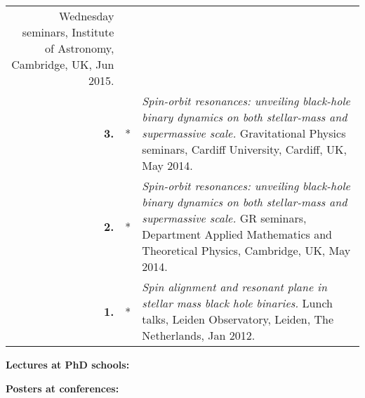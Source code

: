 {\begin{longtable}{rp{0.3cm}p{15.8cm}}
\newline{}
Wednesday seminars, Institute of Astronomy, Cambridge, UK, Jun 2015.
\vspace{0.05cm}\\
%
\textbf{3.} & * & \textit{Spin-orbit resonances: unveiling black-hole binary dynamics on both stellar-mass and supermassive scale.}
\newline{}
Gravitational Physics seminars, Cardiff University, Cardiff, UK, May 2014.
\vspace{0.05cm}\\
%
\textbf{2.} & * & \textit{Spin-orbit resonances: unveiling black-hole binary dynamics on both stellar-mass and supermassive scale.}
\newline{}
GR seminars, Department Applied Mathematics and Theoretical Physics, Cambridge, UK,  May 2014.
\vspace{0.05cm}\\
%
\textbf{1.} & * & \textit{Spin alignment and resonant plane in stellar mass black hole binaries.}
\newline{}
Lunch talks, Leiden Observatory, Leiden, The Netherlands, Jan 2012.
\vspace{0.05cm}\\
%
\end{longtable} }
\textcolor{color1}{\textbf{Lectures at PhD schools:}}
\vspace{-0.5cm}

\textcolor{color1}{\textbf{Posters at conferences:}}
\vspace{-0.5cm}

